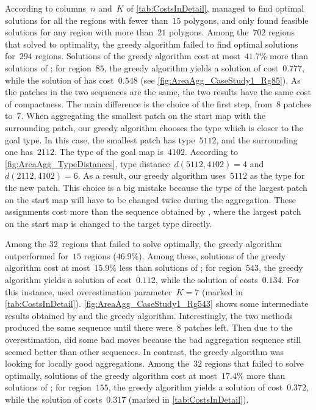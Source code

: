 According to columns~$n$ and~$K$ of \tab\ref{tab:CostsInDetail},
\AstarTwo managed to find optimal solutions 
for all the regions with fewer than~$15$ polygons,
and only found feasible solutions 
for any region with more than~$21$ polygons.
Among the~$702$ regions that 
\AstarTwo solved to optimality,
the greedy algorithm failed to 
find optimal solutions for~$294$ regions.
Solutions of the greedy algorithm cost
at most~$41.7\%$ more than 
solutions of \AstarTwo;
for region~$85$, the greedy algorithm yields 
a solution of cost~$0.777$, 
while the solution of \AstarTwo has cost~$0.548$
(see \fig\ref{fig:AreaAgg_CaseStudy1_Rg85}).
As the patches in the two sequences are the same,
the two results have the same cost of compactness.
The main difference is the choice of the first step, 
from~$8$ patches to~$7$.
When aggregating the smallest patch on the start map
with the surrounding patch,
our greedy algorithm chooses the type 
which is closer to the goal type.
In this case, the smallest patch has type~$5112$, and the 
surrounding one has~$2112$.
The type of the goal map is~$4102$.
According to \fig\ref{fig:AreaAgg_TypeDistances},
type distance~$d(5112,4102)=4$ and~$d(2112,4102)=6$.
As a result, our greedy algorithm uses~$5112$ 
as the type for the new patch. 
This choice is a big mistake 
because the type of the largest patch on the start map
will have to be changed twice during the aggregation.
These assignments cost more than the sequence obtained by 
\AstarTwo, 
where the largest patch on the start map is changed to 
the target type directly.

Among the $32$~regions that 
\AstarTwo failed to solve optimally,
the greedy algorithm outperformed \AstarTwo 
for~$15$ regions ($46.9\%$).
%
Among these, solutions of the greedy algorithm 
cost at most~$15.9\%$ less than solutions of \AstarTwo;
for region~$543$, the greedy algorithm yields 
a solution of cost~$0.112$, 
while the solution of \AstarTwo costs~$0.134$. 
For this instance, 
\AstarTwo used overestimation parameter~$K=7$
(marked in \tab\ref{tab:CostsInDetail}).
\fig\ref{fig:AreaAgg_CaseStudy1_Rg543} shows 
some intermediate results obtained by
\AstarTwo and the greedy algorithm.
Interestingly, the two methods produced the same sequence until 
there were~$8$ patches left.
Then due to the overestimation, 
\AstarTwo did some bad moves
because the bad aggregation sequence still seemed better 
than other sequences.
In contrast, the greedy algorithm was looking for locally good 
aggregations.
%
Among the~$32$ regions that 
\AstarTwo failed to solve optimally,  
solutions of the greedy algorithm cost at most~$17.4\%$ 
more than solutions of \AstarTwo; 
for region~$155$, the greedy algorithm yields 
a solution of cost~$0.372$, while
the solution of \AstarTwo costs~$0.317$
(marked in \tab\ref{tab:CostsInDetail}).

